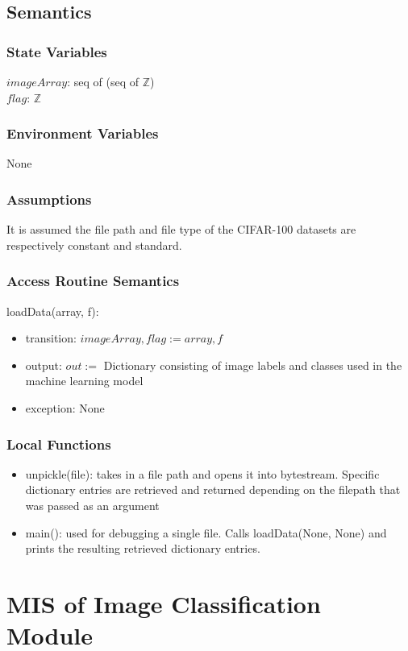 \documentclass[12pt, titlepage]{article}
\begin{document}
\subsection{Semantics}
\subsubsection{State Variables}
$imageArray$: seq of (seq of $\mathbb{Z}$)\\
$flag$: $\mathbb{Z}$
\subsubsection{Environment Variables}
None
\subsubsection{Assumptions}
It is assumed the file path and file type of the CIFAR-100 datasets are respectively constant and standard.
\subsubsection{Access Routine Semantics}
\noindent loadData(array, f):
\begin{itemize}
	\item transition: $imageArray, flag := array, f$
	\item output: $out :=$ Dictionary consisting of image labels and classes used in the machine learning model
	\item exception: None
\end{itemize}
\subsubsection{Local Functions}
\begin{itemize}
	\item{unpickle(file): takes in a file path and opens it into bytestream. Specific dictionary entries are retrieved and returned depending on the filepath that was passed as an argument}
	\item{main(): used for debugging a single file. Calls loadData(None, None) and prints the resulting retrieved dictionary entries. }
\end{itemize}

\newpage

\section{MIS of Image Classification Module} \label{ImageClassification}
\end{document}
